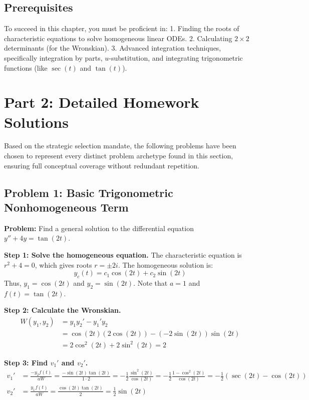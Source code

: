 \documentclass{article}
\begin{document}
\subsection{Prerequisites}
To succeed in this chapter, you must be proficient in:
1. Finding the roots of characteristic equations to solve homogeneous linear ODEs.
2. Calculating $2 \times 2$ determinants (for the Wronskian).
3. Advanced integration techniques, specifically integration by parts, $u$-substitution, and integrating trigonometric functions (like $\sec(t)$ and $\tan(t)$).

\section{Part 2: Detailed Homework Solutions}
Based on the strategic selection mandate, the following problems have been chosen to represent every distinct problem archetype found in this section, ensuring full conceptual coverage without redundant repetition.

\subsection{Problem 1: Basic Trigonometric Nonhomogeneous Term}
\textbf{Problem:} Find a general solution to the differential equation $y'' + 4y = \tan(2t)$.

\textbf{Step 1: Solve the homogeneous equation.}
The characteristic equation is $r^2 + 4 = 0$, which gives roots $r = \pm 2i$.
The homogeneous solution is:
\[ y_c(t) = c_1 \cos(2t) + c_2 \sin(2t) \]
Thus, $y_1 = \cos(2t)$ and $y_2 = \sin(2t)$. Note that $a = 1$ and $f(t) = \tan(2t)$.

\textbf{Step 2: Calculate the Wronskian.}
\begin{align*}
W(y_1, y_2) &= y_1 y_2' - y_1' y_2 \\
&= \cos(2t)(2\cos(2t)) - (-2\sin(2t))\sin(2t) \\
&= 2\cos^2(2t) + 2\sin^2(2t) = 2
\end{align*}

\textbf{Step 3: Find $v_1'$ and $v_2'$.}
\begin{align*}
v_1' &= \frac{-y_2 f(t)}{a W} = \frac{-\sin(2t) \tan(2t)}{1 \cdot 2} = -\frac{1}{2} \frac{\sin^2(2t)}{\cos(2t)} = -\frac{1}{2} \frac{1 - \cos^2(2t)}{\cos(2t)} = -\frac{1}{2} (\sec(2t) - \cos(2t)) \\
v_2' &= \frac{y_1 f(t)}{a W} = \frac{\cos(2t) \tan(2t)}{2} = \frac{1}{2} \sin(2t)
\end{align*}
\end{document}
